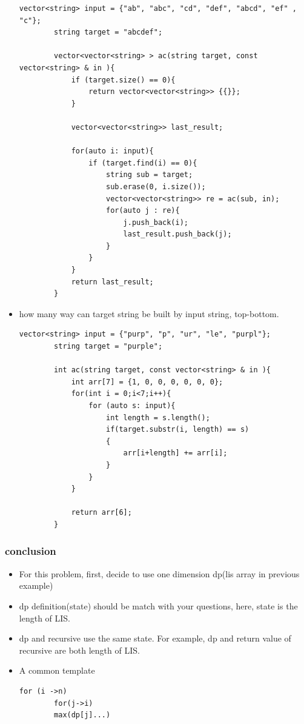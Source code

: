 \documentclass[a4paper,11pt,twoside]{book}
\begin{document}
\begin{itemize}
	\begin{lstlisting}[numbers=none]
		vector<string> input = {"ab", "abc", "cd", "def", "abcd", "ef" , "c"};
		string target = "abcdef";
		
		vector<vector<string> > ac(string target, const vector<string> & in ){
			if (target.size() == 0){
				return vector<vector<string>> {{}};
			}
			
			vector<vector<string>> last_result;
			
			for(auto i: input){
				if (target.find(i) == 0){
					string sub = target;
					sub.erase(0, i.size());
					vector<vector<string>> re = ac(sub, in);
					for(auto j : re){
						j.push_back(i);
						last_result.push_back(j);
					}
				}
			}
			return last_result;
		}
	\end{lstlisting} 
	
	\item how many way can target string be built by input string, top-bottom.
	\begin{lstlisting}[numbers=none]
		vector<string> input = {"purp", "p", "ur", "le", "purpl"};
		string target = "purple";
		
		int ac(string target, const vector<string> & in ){	
			int arr[7] = {1, 0, 0, 0, 0, 0, 0};
			for(int i = 0;i<7;i++){
				for (auto s: input){
					int length = s.length();
					if(target.substr(i, length) == s)
					{
						arr[i+length] += arr[i];
					}		
				}
			}
			
			return arr[6];
		}
	\end{lstlisting} 
	
\end{itemize}

\subsubsection{conclusion}
\begin{itemize}
	\item For this problem, first, decide to use one dimension dp(lis array in previous example)
	\item dp definition(state) should be match with your questions, here, state is the length of LIS. 
	\item dp and recursive use the same state. For example, dp and return value of recursive are both length of LIS.
	\item A common template
	\begin{lstlisting}[numbers=none]
		for (i ->n)
		for(j->i)
		max(dp[j]...)
	\end{lstlisting}
	
\end{itemize}
\end{document}
